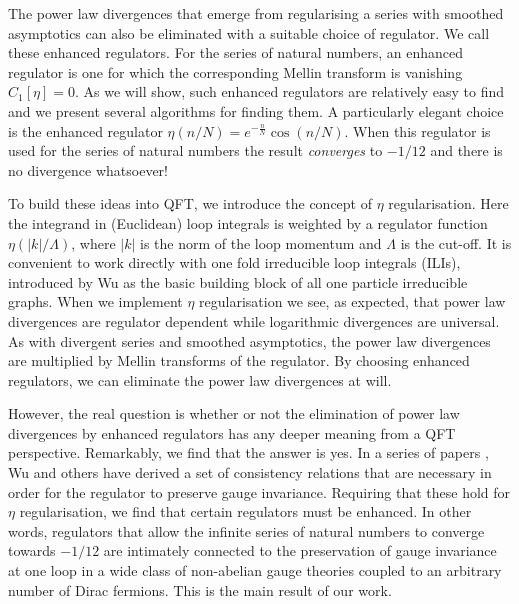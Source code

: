 \documentclass[11pt, letter]{article}
\begin{document}
The power law divergences that emerge from regularising a series with smoothed asymptotics can also be eliminated with a suitable choice of regulator.  We call these enhanced regulators. For the series of natural numbers, an enhanced regulator is one for which the corresponding Mellin transform is vanishing $C_1[\eta]=0$. As we will show, such enhanced regulators are relatively easy to find and we present several algorithms for finding them.  A particularly elegant choice is the enhanced regulator $\eta(n/N)=e^{-\frac{n}{N}} \cos (n/N)$. When this regulator is used for the series of natural numbers the result {\it converges} to $-1/12$ and there is no divergence whatsoever!

To build these  ideas into QFT, we introduce the concept of $\eta$ regularisation. Here the integrand in (Euclidean) loop integrals is weighted by a regulator function $\eta(|k|/\Lambda)$, where $|k|$ is the norm of the loop momentum and $\Lambda$ is the cut-off.  It is convenient to work directly with  one fold irreducible loop integrals (ILIs), introduced by Wu \cite{Wu03} as the basic building block of all one particle  irreducible graphs.  When we implement $\eta$ regularisation we see, as expected, that power law divergences are regulator dependent while logarithmic divergences are universal.  As with divergent series and smoothed asymptotics, the power law divergences are multiplied by Mellin transforms of the regulator.  By choosing enhanced regulators, we can eliminate the power law divergences at will.  

However, the real question is whether or not the elimination of power law divergences by enhanced regulators has any deeper meaning from a QFT perspective.  Remarkably, we find that the answer is yes. In a series of papers \cite{Wu03,Wu04,Wu12,Wu13,Wu14,Wu17}, Wu and others have derived a set of consistency relations that are necessary in order for the regulator to preserve gauge invariance. Requiring that these hold for $\eta$ regularisation, we find that certain regulators must be enhanced.  In other words, regulators that allow the infinite series of natural numbers to converge towards $-1/12$ are intimately connected to the preservation of gauge invariance at one loop in a wide class of non-abelian gauge theories coupled to an arbitrary number of Dirac fermions.  This is the main result of our work. 
\end{document}

